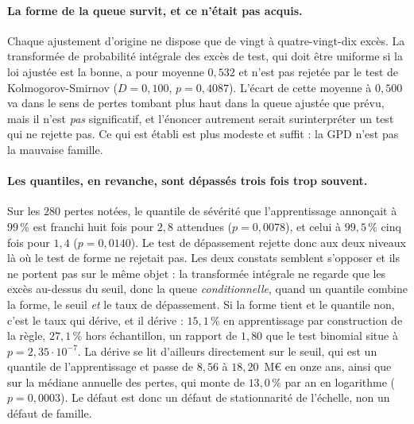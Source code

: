 \paragraph{La forme de la queue survit, et ce n'était pas acquis.} Chaque ajustement d'origine ne
dispose que de vingt à quatre-vingt-dix excès. La transformée de probabilité intégrale des excès
de test, qui doit être uniforme si la loi ajustée est la bonne, a pour moyenne $0{,}532$ et n'est
pas rejetée par le test de Kolmogorov-Smirnov ($D=0{,}100$, $p=0{,}4087$). L'écart de cette
moyenne à $0{,}500$ va dans le sens de pertes tombant plus haut dans la queue ajustée que prévu,
mais il n'est \emph{pas} significatif, et l'énoncer autrement serait surinterpréter un test qui
ne rejette pas. Ce qui est établi est plus modeste et suffit : la GPD n'est pas la mauvaise
famille.

\paragraph{Les quantiles, en revanche, sont dépassés trois fois trop souvent.} Sur les $280$
pertes notées, le quantile de sévérité que l'apprentissage annonçait à $99\,\%$ est franchi huit
fois pour $2{,}8$ attendues ($p=0{,}0078$), et celui à $99{,}5\,\%$ cinq fois pour $1{,}4$
($p=0{,}0140$). Le test de dépassement rejette donc aux deux niveaux là où le test de forme ne
rejetait pas. Les deux constats semblent s'opposer et ils ne portent pas sur le même objet : la
transformée intégrale ne regarde que les excès au-dessus du seuil, donc la queue
\emph{conditionnelle}, quand un quantile combine la forme, le seuil \emph{et} le taux de
dépassement. Si la forme tient et le quantile non, c'est le taux qui dérive, et il dérive :
$15{,}1\,\%$ en apprentissage par construction de la règle, $27{,}1\,\%$ hors échantillon, un
rapport de $1{,}80$ que le test binomial situe à $p=2{,}35\cdot 10^{-7}$. La dérive se lit
d'ailleurs directement sur le seuil, qui est un quantile de l'apprentissage et passe de
$8{,}56$ à $18{,}20$~M\euro{} en onze ans, ainsi que sur la médiane annuelle des pertes, qui
monte de $13{,}0\,\%$ par an en logarithme ($p=0{,}0003$). Le défaut est donc un défaut de
stationnarité de l'échelle, non un défaut de famille.

